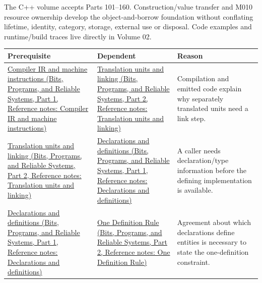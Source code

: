 \hypertarget{appendix-4ad47bdd269a-c---from-buildable-text-to-live-objects}{}

The C++ volume accepts Parts 101--160. Construction/value transfer and M010 resource ownership develop the object-and-borrow foundation without conflating lifetime, identity, category, storage, external use or disposal. Code examples and runtime/build traces live directly in {Volume 02}.

{\def\LTcaptype{none} %
\begin{longtable}[]{@{}
  >{\raggedright\arraybackslash}p{}
  >{\raggedright\arraybackslash}p{}
  >{\raggedright\arraybackslash}p{}@{}}
\toprule\noalign{}
\begin{minipage}[b]{\linewidth}\raggedright
Prerequisite
\end{minipage} & \begin{minipage}[b]{\linewidth}\raggedright
Dependent
\end{minipage} & \begin{minipage}[b]{\linewidth}\raggedright
Reason
\end{minipage} \\
\midrule\noalign{}
\endhead
\bottomrule\noalign{}
\endlastfoot
\href{../01-Bits-Programs-and-Reliable-Systems-P01/main.pdf\#appendix-942ad41afb30}{Compiler IR and machine instructions (Bits, Programs, and Reliable Systems, Part 1, Reference notes: Compiler IR and machine instructions)} & \href{../01-Bits-Programs-and-Reliable-Systems-P02/main.pdf\#appendix-806686359e1b}{Translation units and linking (Bits, Programs, and Reliable Systems, Part 2, Reference notes: Translation units and linking)} & Compilation and emitted code explain why separately translated units need a link step. \\
\href{../01-Bits-Programs-and-Reliable-Systems-P02/main.pdf\#appendix-806686359e1b}{Translation units and linking (Bits, Programs, and Reliable Systems, Part 2, Reference notes: Translation units and linking)} & \href{../01-Bits-Programs-and-Reliable-Systems-P01/main.pdf\#appendix-2e4d494c2d94}{Declarations and definitions (Bits, Programs, and Reliable Systems, Part 1, Reference notes: Declarations and definitions)} & A caller needs declaration/type information before the defining implementation is available. \\
\href{../01-Bits-Programs-and-Reliable-Systems-P01/main.pdf\#appendix-2e4d494c2d94}{Declarations and definitions (Bits, Programs, and Reliable Systems, Part 1, Reference notes: Declarations and definitions)} & \href{../01-Bits-Programs-and-Reliable-Systems-P02/main.pdf\#appendix-49d27bc9d9a5}{One Definition Rule (Bits, Programs, and Reliable Systems, Part 2, Reference notes: One Definition Rule)} & Agreement about which declarations define entities is necessary to state the one-definition constraint. \\

\end{longtable}}
